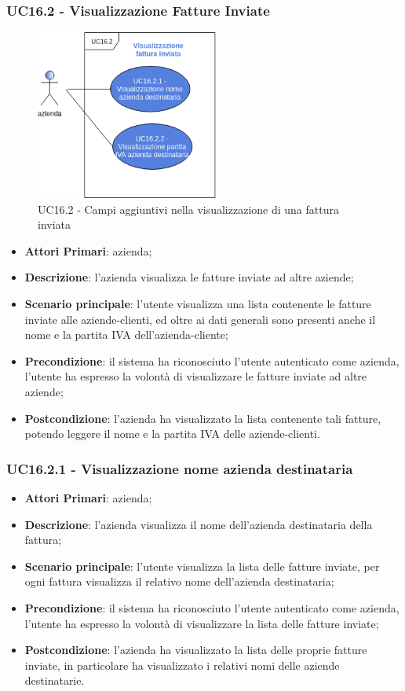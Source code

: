 \subsubsection{UC16.2 - Visualizzazione Fatture Inviate}
\begin{figure}[h]
	\includegraphics[width=6cm]{res/images/UC16-VisualizzazioneFatturaInviata.png}
	\centering
	\caption{UC16.2 - Campi aggiuntivi nella visualizzazione di una fattura inviata}
\end{figure}
\begin{itemize}
	\item \textbf{Attori Primari}: azienda;
	\item \textbf{Descrizione}: l'azienda visualizza le fatture inviate ad altre aziende;
	\item \textbf{Scenario principale}: l'utente visualizza una lista contenente le fatture inviate alle aziende-clienti, ed oltre ai dati generali sono presenti anche il nome e la partita IVA dell'azienda-cliente;
	\item \textbf{Precondizione}: il sistema ha riconosciuto l'utente autenticato come azienda, l'utente ha espresso la volontà di visualizzare le fatture inviate ad altre aziende;
	\item \textbf{Postcondizione}: l'azienda ha visualizzato la lista contenente tali fatture, potendo leggere il nome e la partita IVA delle aziende-clienti.
\end{itemize}
\subsubsection{UC16.2.1 - Visualizzazione nome azienda destinataria}
\begin{itemize}
	\item \textbf{Attori Primari}: azienda;
	\item \textbf{Descrizione}: l'azienda visualizza il nome dell'azienda destinataria della fattura;
	\item \textbf{Scenario principale}: l'utente visualizza la lista delle fatture inviate, per ogni fattura visualizza il relativo nome dell'azienda destinataria;
	\item \textbf{Precondizione}: il sistema ha riconosciuto l'utente autenticato come azienda, l'utente ha espresso la volontà di visualizzare la lista delle fatture inviate;
	\item \textbf{Postcondizione}: l'azienda ha visualizzato la lista delle proprie fatture inviate, in particolare ha visualizzato i relativi nomi delle aziende destinatarie.
\end{itemize} 
